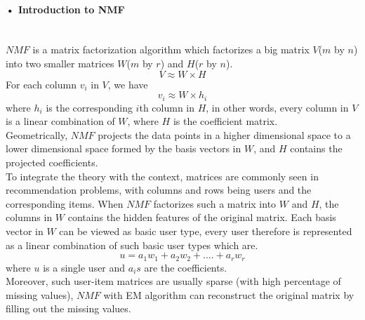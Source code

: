 \documentclass[11pt]{article} %
\begin{document}
\paragraph{• Introduction to NMF}\mbox{}\\
$NMF$ is a matrix factorization algorithm which factorizes a big matrix $V$($m$ by $n$) into two smaller matrices $W$($m$ by $r$) and $H$($r$ by $n$).
\begin{equation}\label{eq1}
V\approx W \times H
\end{equation}
For each column $v_{i}$ in $V$, we have
\begin{equation}
v_{i} \approx W \times h_{i}
\end{equation}
where $h_{i}$ is the corresponding $i$th column in $H$, in other words, every column in $V$ is a linear combination of $W$, where $H$ is the coefficient matrix.\\
Geometrically, $NMF$ projects the data points in a higher dimensional space to a lower dimensional space formed by the basis vectors in $W$, and $H$ contains the projected coefficients.\\
To integrate the theory with the context, matrices are commonly seen in recommendation problems, with columns and rows being users and the corresponding items. When $NMF$ factorizes such a matrix into $W$ and $H$, the columns in $W$ contains the hidden features of the original matrix. Each basis vector in $W$ can be viewed as basic user type, every user therefore is represented as a linear combination of such basic user types which are.
\begin{equation}
u = a_1w_1+a_2w_2+....+a_rw_r
\end{equation}
where $u$ is a single user and $a_is$ are the coefficients.\\
Moreover, such user-item matrices are usually sparse (with high percentage of missing values), $NMF$ with EM algorithm can reconstruct the original matrix by filling out the missing values.
\end{document}
